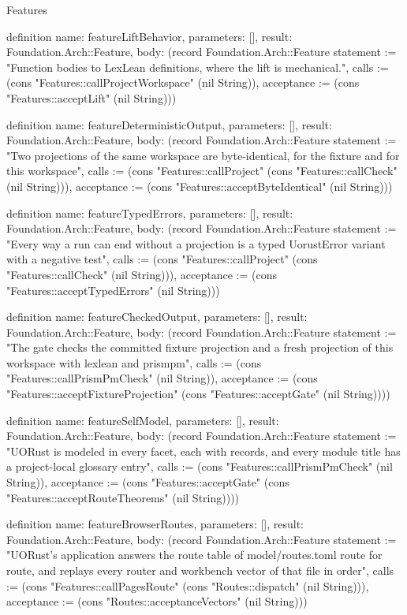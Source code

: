 \begin{lexlean}{Features}
\begin{semanticmodule}
definition{
  name: featureLiftBehavior,
  parameters: [],
  result: Foundation.Arch::Feature,
  body: (record Foundation.Arch::Feature {statement := "Function bodies to LexLean definitions, where the lift is mechanical.", calls := (cons "Features::callProjectWorkspace" (nil String)), acceptance := (cons "Features::acceptLift" (nil String))})
}

definition{
  name: featureDeterministicOutput,
  parameters: [],
  result: Foundation.Arch::Feature,
  body: (record Foundation.Arch::Feature {statement := "Two projections of the same workspace are byte-identical, for the fixture and for this workspace", calls := (cons "Features::callProject" (cons "Features::callCheck" (nil String))), acceptance := (cons "Features::acceptByteIdentical" (nil String))})
}

definition{
  name: featureTypedErrors,
  parameters: [],
  result: Foundation.Arch::Feature,
  body: (record Foundation.Arch::Feature {statement := "Every way a run can end without a projection is a typed UorustError variant with a negative test", calls := (cons "Features::callProject" (cons "Features::callCheck" (nil String))), acceptance := (cons "Features::acceptTypedErrors" (nil String))})
}

definition{
  name: featureCheckedOutput,
  parameters: [],
  result: Foundation.Arch::Feature,
  body: (record Foundation.Arch::Feature {statement := "The gate checks the committed fixture projection and a fresh projection of this workspace with lexlean and prismpm", calls := (cons "Features::callPrismPmCheck" (nil String)), acceptance := (cons "Features::acceptFixtureProjection" (cons "Features::acceptGate" (nil String)))})
}

definition{
  name: featureSelfModel,
  parameters: [],
  result: Foundation.Arch::Feature,
  body: (record Foundation.Arch::Feature {statement := "UORust is modeled in every facet, each with records, and every module title has a project-local glossary entry", calls := (cons "Features::callPrismPmCheck" (nil String)), acceptance := (cons "Features::acceptGate" (cons "Features::acceptRouteTheorems" (nil String)))})
}

definition{
  name: featureBrowserRoutes,
  parameters: [],
  result: Foundation.Arch::Feature,
  body: (record Foundation.Arch::Feature {statement := "UORust's application answers the route table of model/routes.toml route for route, and replays every router and workbench vector of that file in order", calls := (cons "Features::callPagesRoute" (cons "Routes::dispatch" (nil String))), acceptance := (cons "Routes::acceptanceVectors" (nil String))})
}


\end{semanticmodule}
\end{lexlean}

